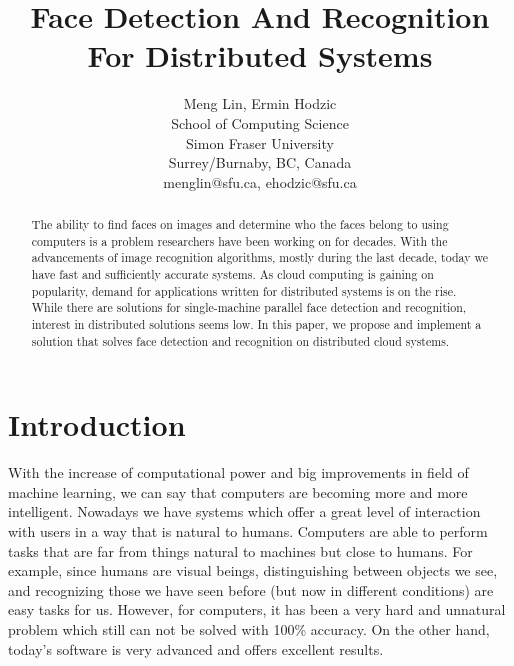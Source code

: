 \documentclass[11pt, draftclsnofoot, onecolumn]{IEEEtran}
\begin{document}
\title{Face Detection And Recognition For Distributed Systems}

\author{Meng Lin, Ermin Hodzic\\
        School of Computing Science\\
        Simon Fraser University\\
        Surrey/Burnaby, BC, Canada \\
        menglin@sfu.ca, ehodzic@sfu.ca  \\
}



\date{}
\maketitle

\begin{abstract}

The ability to find faces on images and determine who the faces belong to using computers is a problem researchers have been working on for decades. With the advancements of image recognition algorithms, mostly during the last decade, today we have fast and sufficiently accurate systems. As cloud computing is gaining on popularity, demand for applications written for distributed systems is on the rise. While there are solutions for single-machine parallel face detection and recognition, interest in distributed solutions seems low. In this paper, we propose and implement a solution that solves face detection and recognition on distributed cloud systems.

\end{abstract}


\section{Introduction} \label{sec:introduction}

With the increase of computational power and big improvements in field of machine learning, we can say that computers are becoming more and more intelligent. Nowadays we have systems which offer a great level of interaction with users in a way that is natural to humans. Computers are able to perform tasks that are far from things natural to machines but close to humans. For example, since humans are visual beings, distinguishing between objects we see, and recognizing those we have seen before (but now in different conditions) are easy tasks for us. However, for computers, it has been a very hard and unnatural problem which still can not be solved with 100\% accuracy. On the other hand, today's software is very advanced and offers excellent results.
\end{document}
